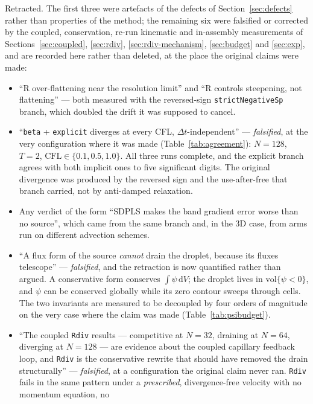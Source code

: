 \documentclass[preprint,3p,11pt]{elsarticle}
\newcommand{\psilev}{\psi}
\begin{document}
Retracted. The first three were artefacts of the defects of
Section~\ref{sec:defects} rather than properties of the method; the remaining
six were falsified or corrected by the coupled, conservation, re-run kinematic and
in-assembly measurements of Sections~\ref{sec:coupled}, \ref{sec:rdiv},
\ref{sec:rdiv-mechanism}, \ref{sec:budget} and \ref{sec:exp}, and are recorded
here rather than deleted, at the place the original claims were made:
\begin{itemize}
  \item ``R over-flattening near the resolution limit'' and ``R controls
    steepening, not flattening'' --- both measured with the reversed-sign
    \texttt{strictNegativeSp} branch, which doubled the drift it was supposed
    to cancel.
  \item ``\texttt{beta} + \texttt{explicit} diverges at every CFL,
    $\Delta t$-independent'' --- \emph{falsified}, at the very configuration
    where it was made (Table~\ref{tab:agreement}): $N=128$, $T=2$,
    $\mathrm{CFL} \in \{0.1, 0.5, 1.0\}$. All three runs complete, and the
    explicit branch agrees with both implicit ones to five significant digits.
    The original divergence was produced by the reversed sign and the
    use-after-free that branch carried, not by anti-damped relaxation.
  \item Any verdict of the form ``SDPLS makes the band gradient error worse
    than no source'', which came from the same branch and, in the 3D case,
    from arms run on different advection schemes.
  \item ``A flux form of the source \emph{cannot} drain the droplet, because its
    fluxes telescope'' --- \emph{falsified}, and the retraction is now quantified
    rather than argued. A conservative form conserves
    $\int\psilev\,\mathrm dV$; the droplet lives in
    $\mathrm{vol}\{\psilev<0\}$, and $\psilev$ can be conserved globally while
    its zero contour sweeps through cells. The two invariants are measured to be
    decoupled by four orders of magnitude on the very case where the claim was
    made (Table~\ref{tab:psibudget}).
  \item ``The coupled \texttt{Rdiv} results --- competitive at $N=32$, draining
    at $N=64$, diverging at $N=128$ --- are evidence about the coupled capillary
    feedback loop, and \texttt{Rdiv} is the conservative rewrite that should have
    removed the drain structurally'' --- \emph{falsified}, at a configuration the
    original claim never ran. \texttt{Rdiv} fails in the same pattern under a
    \emph{prescribed}, divergence-free velocity with no momentum equation, no

\end{itemize}
\end{document}
